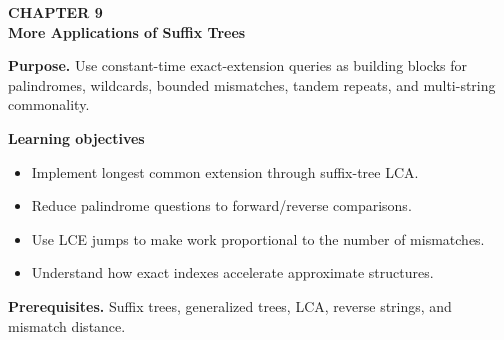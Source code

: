 \documentclass[11pt]{article}
\begin{document}
\begin{tcolorbox}[
  enhanced,breakable,colback=Primary!4,colframe=Primary,boxrule=0.9pt,
  arc=2mm,left=3mm,right=3mm,top=2.5mm,bottom=2.5mm]
{\sffamily\color{Accent}\bfseries CHAPTER 9}\\[-1pt]
{\sffamily\LARGE\bfseries\color{Primary} More Applications of Suffix Trees}

\vspace{2pt}
\textbf{Purpose.} Use constant-time exact-extension queries as building blocks for palindromes, wildcards, bounded mismatches, tandem repeats, and multi-string commonality.

\textbf{Learning objectives}
\begin{itemize}
  \item Implement longest common extension through suffix-tree LCA.
  \item Reduce palindrome questions to forward/reverse comparisons.
  \item Use LCE jumps to make work proportional to the number of mismatches.
  \item Understand how exact indexes accelerate approximate structures.
\end{itemize}

\textbf{Prerequisites.} Suffix trees, generalized trees, LCA, reverse strings, and mismatch distance.
\end{tcolorbox}
\end{document}
